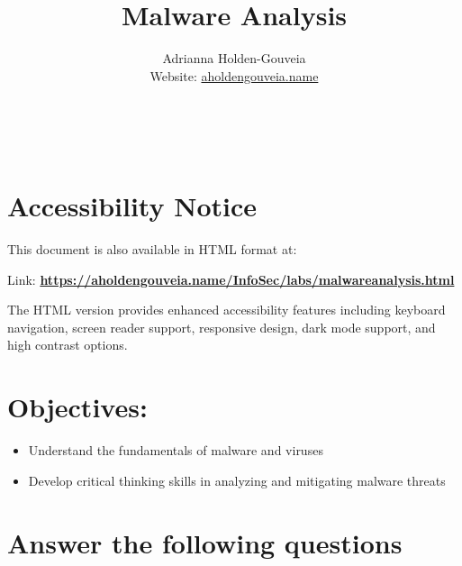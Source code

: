 \documentclass[12pt]{article}
\title{Malware Analysis}
\author{
        Adrianna Holden-Gouveia \\
        Website: \href{https://aholdengouveia.name}{aholdengouveia.name}\\ 
        \date{\vspace{-5ex}}
        \faGithub {: aholdengouveia} \\
        \faTwitter {: aholdengouveia} \\
        }
\begin{document}
    

\maketitle

\section*{Accessibility Notice}
This document is also available in HTML format at:

Link: \href{https://aholdengouveia.name/InfoSec/labs/malwareanalysis.html}{\textbf{https://aholdengouveia.name/InfoSec/labs/malwareanalysis.html}}

The HTML version provides enhanced accessibility features including keyboard navigation, screen reader support, responsive design, dark mode support, and high contrast options.



\section*{Objectives:}
\begin{itemize}
    \item Understand the fundamentals of malware and viruses
    \item Develop critical thinking skills in analyzing and mitigating malware threats
\end{itemize}
\section*{Answer the following questions}

\end{document}

